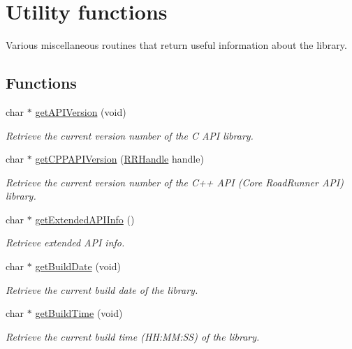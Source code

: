 \hypertarget{group__utility}{\section{Utility functions}
\label{group__utility}
}


Various miscellaneous routines that return useful information about the library.  


\subsection*{Functions}
\begin{DoxyCompactItemize}
\item 
char $\ast$ \hyperlink{group__utility_ga0201bfe0112ad64005f753c3ef9f967a}{get\+A\+P\+I\+Version} (void)
\begin{DoxyCompactList}\small\item\em Retrieve the current version number of the C A\+P\+I library. \end{DoxyCompactList}\item 
char $\ast$ \hyperlink{group__utility_ga691ff48bcf6063a8544ee17c78c08a2e}{get\+C\+P\+P\+A\+P\+I\+Version} (\hyperlink{rrc__types_8h_a1d68f0592372208fa5a5f2799ea4b3ae}{R\+R\+Handle} handle)
\begin{DoxyCompactList}\small\item\em Retrieve the current version number of the C++ A\+P\+I (Core Road\+Runner A\+P\+I) library. \end{DoxyCompactList}\item 
char $\ast$ \hyperlink{group__utility_ga6375654feeeed364756d04996ffefca0}{get\+Extended\+A\+P\+I\+Info} ()
\begin{DoxyCompactList}\small\item\em Retrieve extended A\+P\+I info. \end{DoxyCompactList}\item 
char $\ast$ \hyperlink{group__utility_ga93a30bba20e93116a92454023621e152}{get\+Build\+Date} (void)
\begin{DoxyCompactList}\small\item\em Retrieve the current build date of the library. \end{DoxyCompactList}\item 
char $\ast$ \hyperlink{group__utility_ga37e61c01f414819c0997592a2fd7923d}{get\+Build\+Time} (void)
\begin{DoxyCompactList}\small\item\em Retrieve the current build time (H\+H\+:\+M\+M\+:S\+S) of the library. \end{DoxyCompactList}\item 

\end{DoxyCompactItemize}
